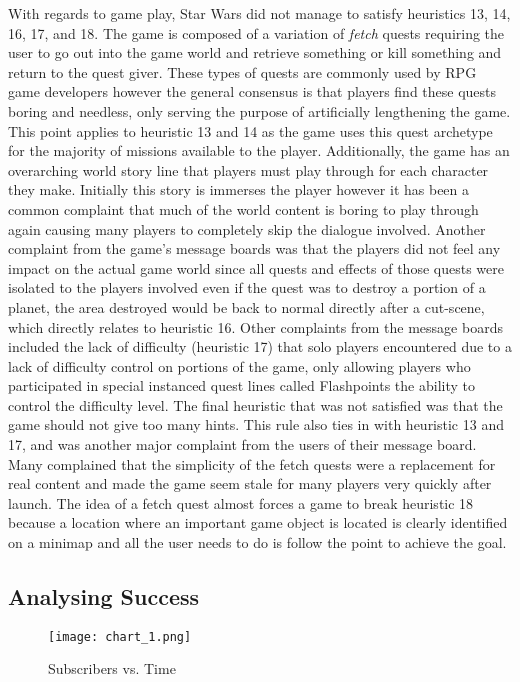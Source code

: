 \documentclass[12pt]{report}
\begin{document}
With regards to game play, Star Wars did not manage to satisfy heuristics 13, 14, 16, 17, and 18. The game is composed of a variation of \textit{fetch} quests requiring the user to go out into the game world and retrieve something or kill something and return to the quest giver. These types of quests are commonly used by RPG game developers however the general consensus is that players find these quests boring and needless, only serving the purpose of artificially lengthening the game\cite{FetchQuest}. This point applies to heuristic 13 and 14 as the game uses this quest archetype for the majority of missions available to the player. Additionally, the game has an overarching world story line that players must play through for each character they make. Initially this story is immerses the player however it has been a common complaint that much of the world content is boring to play through again causing many players to completely skip the dialogue involved. Another complaint from the game's message boards was that the players did not feel any impact on the actual game world since all quests and effects of those quests were isolated to the players involved even if the quest was to destroy a portion of a planet, the area destroyed would be back to normal directly after a cut-scene, which directly relates to heuristic 16. Other complaints from the message boards included the lack of difficulty (heuristic 17) that solo players encountered due to a lack of difficulty control on portions of the game, only allowing players who participated in special instanced quest lines called Flashpoints the ability to control the difficulty level. The final heuristic that was not satisfied was
that the game should not give too many hints. This rule also ties in with heuristic 13 and 17, and was another major complaint from the users of their message board. Many complained that the simplicity of the fetch quests were a replacement for real content and made the game seem stale for many players very quickly after launch. The idea of a fetch quest almost forces a game to break heuristic 18 because a location where an important game object is located is clearly identified on a minimap and all the user needs to do is follow the point to achieve the goal. 

\subsection{Analysing Success}

\begin{figure}
\begin{center}
\leavevmode
\texttt{[image: chart\_1.png]}
\end{center}
\caption{Subscribers vs. Time \cite{Subnumbers}}
\label{fig:subvtime}
\end{figure}
\end{document}
